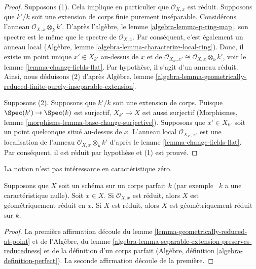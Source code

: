 \begin{proof}
Supposons (1). Cela implique en particulier que
$\mathcal{O}_{X, x}$ est réduit. Supposons que $k'/k$ soit une
extension de corps finie purement inséparable. Considérons
l'anneau $\mathcal{O}_{X, x} \otimes_k k'$. D'après l'algèbre,
le lemme \ref{algebra-lemma-p-ring-map}, son spectre est le
même que le spectre de $\mathcal{O}_{X, x}$. Par conséquent,
c'est également un anneau local (Algèbre, lemme
\ref{algebra-lemma-characterize-local-ring}). Donc, il existe un
point unique $x' \in X_{k'}$ au-dessus de $x$ et de
$\mathcal{O}_{X_{k'}, x'} \cong \mathcal{O}_{X, x} \otimes_k k'$, voir
le lemme \ref{lemma-change-fields-flat}. Par hypothèse, il s'agit d'un
anneau réduit. Ainsi, nous déduisons (2) d'après Algèbre, lemme
\ref{algebra-lemma-geometrically-reduced-finite-purely-inseparable-extension}.

\medskip\noindent
Supposons (2). Supposons que $k'/k$ soit une extension
de corps. Puisque $\Spec(k') \to \Spec(k)$ est surjectif,
$X_{k'} \to X$ est aussi surjectif (Morphismes, lemme
\ref{morphisms-lemma-base-change-surjective}). Supposons
que $x' \in X_{k'}$ soit un point quelconque situé
au-dessus de $x$. L'anneau local $\mathcal{O}_{X_{k'}, x'}$
est une localisation de l'anneau $\mathcal{O}_{X, x}
\otimes_k k'$ d'après le lemme \ref{lemma-change-fields-flat}.
Par conséquent, il est réduit par hypothèse et (1) est prouvé.
\end{proof}

\noindent
La notion n'est pas intéressante en caractéristique zéro.

\begin{lemma}
\label{lemma-perfect-reduced}
Supposons que $X$ soit un schéma sur un corps parfait $k$ (par
exemple \ $k$ a une caractéristique nulle). Soit $x \in X$. Si
$\mathcal{O}_{X, x}$ est réduit, alors $X$ est géométriquement réduit
en $x$. Si $X$ est réduit, alors $X$ est géométriquement réduit sur $k$.
\end{lemma}

\begin{proof}
La première affirmation découle du lemme
\ref{lemma-geometrically-reduced-at-point} et de
l'Algèbre, du lemme
\ref{algebra-lemma-separable-extension-preserves-reducedness} et de
la définition d'un corps parfait (Algèbre, définition
\ref{algebra-definition-perfect}). La seconde affirmation découle de la première.
\end{proof}

